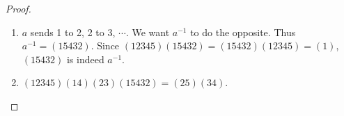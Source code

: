 \documentclass[12pt, psamsfonts]{amsart}
\theoremstyle{definition}
\theoremstyle{remark}
\numberwithin{equation}{section}
\begin{document}
\begin{proof}
  $ $
  \begin{enumerate}
    \item
      $a$ sends 1 to 2, 2 to 3, $\cdots$.
      We want $a^{-1}$ to do the opposite.
      Thus $a^{-1} = (15432)$.
      Since $(12345)(15432) = (15432)(12345) = (1)$, $(15432)$ is indeed $a^{-1}$.
    \item
      $(12345)(14)(23)(15432) = (25)(34)$.
  \end{enumerate}
\end{proof}
\end{document}
